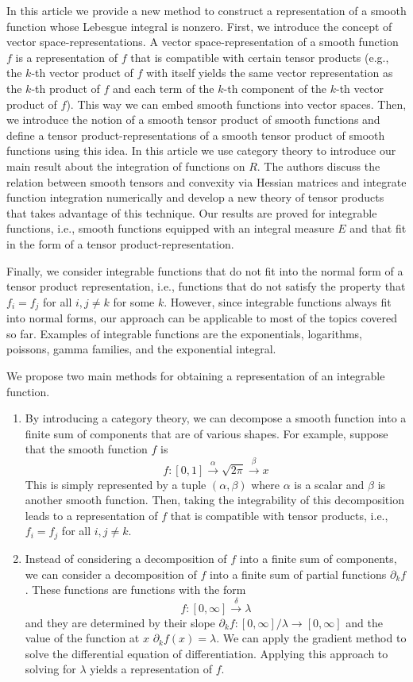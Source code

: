 \documentclass[a4paper,reqno,oneside]{article}
\begin{document}
In this article we provide a new method to construct a representation of a smooth function whose Lebesgue integral is nonzero. First, we introduce the concept of vector space-representations. A vector space-representation of a smooth function $f$ is a representation of $f$ that is compatible with certain tensor products (e.g., the $k$-th vector product of $f$ with itself yields the same vector representation as the $k$-th product of $f$ and each term of the $k$-th component of the $k$-th vector product of $f$). This way we can embed smooth functions into vector spaces. Then, we introduce the notion of a smooth tensor product of smooth functions and define a tensor product-representations of a smooth tensor product of smooth functions using this idea. In this article we use category theory to introduce our main result about the integration of functions on $R$. The authors discuss the relation between smooth tensors and convexity via Hessian matrices and integrate function integration numerically and develop a new theory of tensor products that takes advantage of this technique. Our results are proved for integrable functions, i.e., smooth functions equipped with an integral measure $E$ and that fit in the form of a tensor product-representation.

Finally, we consider integrable functions that do not fit into the normal form of a tensor product representation, i.e., functions that do not satisfy the property that $f_i=f_{j}$ for all $i, j \neq k$ for some $k$. However, since integrable functions always fit into normal forms, our approach can be applicable to most of the topics covered so far. Examples of integrable functions are the exponentials, logarithms, poissons, gamma families, and the exponential integral.

We propose two main methods for obtaining a representation of an integrable function.

\begin{enumerate}
  \item By introducing a category theory, we can decompose a smooth function into a finite sum of components that are of various shapes. For example, suppose that the smooth function $f$ is
  \[
 f: [0,1] \xrightarrow{\alpha} \sqrt{2\pi} \xrightarrow{\beta} x
  \]
  This is simply represented by a tuple $(\alpha, \beta)$ where $\alpha$ is a scalar and $\beta$ is another smooth function. Then, taking the integrability of this decomposition leads to a representation of $f$ that is compatible with tensor products, i.e., $f_i = f_{j}$ for all $i,j \neq k$. 
  \item Instead of considering a decomposition of $f$ into a finite sum of components, we can consider a decomposition of $f$ into a finite sum of partial functions $\partial_k f$. These functions are functions with the form
  \[
 f: [0,\infty] \xrightarrow{\delta} \lambda
  \]
  and they are determined by their slope $\partial_k f: [0,\infty]/\lambda \to [0,\infty]$ and the value of the function at $x$ $\partial_k f(x) = \lambda$. We can apply the gradient method to solve the differential equation of differentiation. Applying this approach to solving for $\lambda$ yields a representation of $f$.
\end{enumerate}
\end{document}
